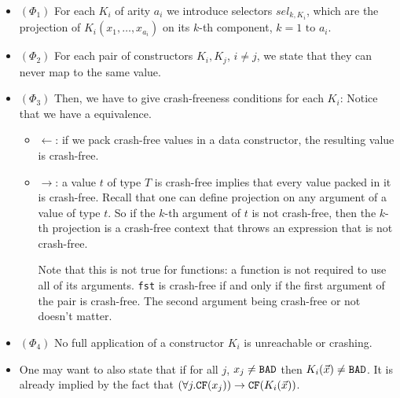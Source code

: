 \documentclass[preprint]{sigplanconf}
\begin{document}
\begin{itemize}
\item $(\Phi_1)$ For each $K_i$ of arity $a_i$ we introduce selectors
  $sel_{k,K_i}$, which are the projection of $K_i(x_1,\dots,x_{a_i})$
  on its $k$-th component, $k = 1\text{ to }a_i$.
\item $(\Phi_2)$ For each pair of constructors $K_i,K_j$, $i \not = j$, we state that they can
  never map to the same value.
\item $(\Phi_3)$ Then, we have to give crash-freeness conditions for each $K_i$:
  Notice that we have a equivalence.
  \begin{itemize}
  \item $\gets$: if we pack crash-free values in a data
    constructor, the resulting value is crash-free.
  \item $\to$: a value $t$ of type $T$ is crash-free implies
    that every value packed in it is crash-free. Recall that one can
    define projection on any argument of a value of type $t$. So if
    the $k$-th argument of $t$ is not crash-free, then the $k$-th
    projection is a crash-free context that throws an expression that
    is not crash-free.

  Note that this is not true for functions: a function is not required
  to use all of its arguments. \texttt{fst} is crash-free if and only
  if the first argument of the pair is crash-free. The second argument
  being crash-free or not doesn't matter.
  \end{itemize}

\item $(\Phi_4)$ No full application of a constructor $K_i$ is unreachable or crashing.
\item One may want to also state that if for all $j$, $x_j \neq \texttt{BAD}$ then
  $K_i(\vec{x}) \neq \texttt{BAD}$. It is already implied by the fact that
  $\left(\forall j. \texttt{CF}(x_j)\right) \to \texttt{CF}(K_i(\vec{x}))$.
\end{itemize}
\end{document}
